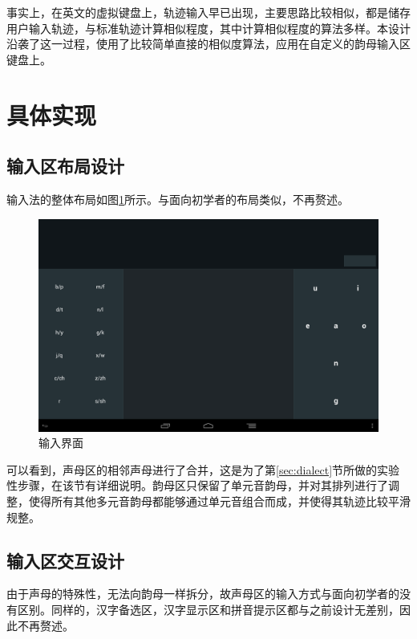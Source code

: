   事实上，在英文的虚拟键盘上，轨迹输入早已出现\supercite{kristenssondiscrete, hinckley2002input, zhai2008interlaced}，主要思路比较相似，都是储存用户输入轨迹，与标准轨迹计算相似程度，其中计算相似程度的算法多样。本设计沿袭了这一过程，使用了比较简单直接的相似度算法，应用在自定义的韵母输入区键盘上。

  \section{具体实现}
  \subsection{输入区布局设计}

  输入法的整体布局如图\ref{fig:layout2_background}所示。与面向初学者的布局类似，不再赘述。

  \begin{figure}[h]
  \noindent\includegraphics[width=150mm]{img/layout2_background}
  \caption{输入界面}
  \label{fig:layout2_background}
  \end{figure}

  可以看到，声母区的相邻声母进行了合并，这是为了第\ref{sec:dialect}节所做的实验性步骤，在该节有详细说明。韵母区只保留了单元音韵母，并对其排列进行了调整，使得所有其他多元音韵母都能够通过单元音组合而成，并使得其轨迹比较平滑规整。

  \subsection{输入区交互设计}

  由于声母的特殊性，无法向韵母一样拆分，故声母区的输入方式与面向初学者的没有区别。同样的，汉字备选区，汉字显示区和拼音提示区都与之前设计无差别，因此不再赘述。

